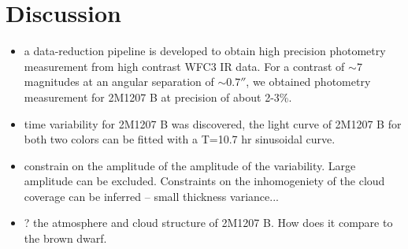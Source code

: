 \documentclass[apj]{emulateapj}
\begin{document}
\section{Discussion }
\begin{itemize}
\item a data-reduction pipeline is developed to obtain high precision
  photometry measurement from high contrast WFC3 IR data. For a
  contrast of $\sim 7$ magnitudes at an angular separation of
  $\sim0.7''$, we obtained photometry measurement for 2M1207 B at
  precision of about 2-3\%. 
\item time variability for 2M1207 B was discovered, the light curve of
  2M1207 B for both two colors can be fitted with a T=10.7 hr
  sinusoidal curve.
\item constrain on the amplitude of the amplitude of the
  variability. Large amplitude can be excluded. Constraints on the
  inhomogeniety of the cloud coverage can be inferred -- small
  thickness variance...
\item ? the atmosphere and cloud structure of 2M1207 B. How does it
  compare to the brown dwarf.
\end{itemize}

\end{document}
